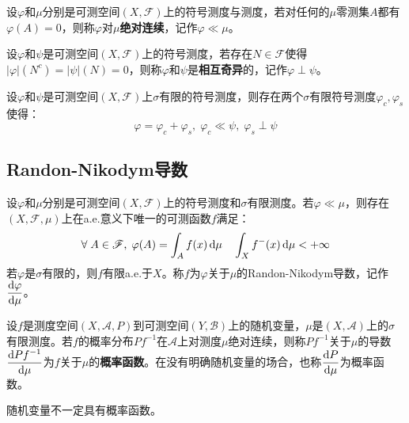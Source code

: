 \begin{definition}
	设$\varphi$和$\mu$分别是可测空间$(X,\mathscr{F})$上的符号测度与测度，若对任何的$\mu$零测集$A$都有$\varphi(A)=0$，则称$\varphi$对$\mu$\textbf{绝对连续}，记作$\varphi\ll\mu$。
\end{definition}
\begin{definition}
	设$\varphi$和$\psi$是可测空间$(X,\mathscr{F})$上的符号测度，若存在$N\in\mathscr{F}$使得$|\varphi|(N^c)=|\psi|(N)=0$，则称$\varphi$和$\psi$是\textbf{相互奇异}的，记作$\varphi\perp\psi$。
\end{definition}
\begin{theorem}
	设$\varphi$和$\psi$是可测空间$(X,\mathscr{F})$上$\sigma$有限的符号测度，则存在两个$\sigma$有限符号测度$\varphi_c,\varphi_s$使得：
	\begin{equation*}
		\varphi=\varphi_c+\varphi_s,\;\varphi_c\ll\psi,\;\varphi_s\perp\psi
	\end{equation*}
\end{theorem}

\subsection{Randon-Nikodym导数}
\begin{theorem}\label{theo:RandomNikodym}
	设$\varphi$和$\mu$分别是可测空间$(X,\mathscr{F})$上的符号测度和$\sigma$有限测度。若$\varphi\ll\mu$，则存在$(X,\mathscr{F},\mu)$上在a.e.意义下唯一的可测函数$f$满足：
	\begin{equation*}
		\forall\;A\in\mathscr{F},\;\varphi(A)=\int_{A}f(x)\mathop{}\!\mathrm{d}\mu\quad\int_{X}f^-(x)\mathop{}\!\mathrm{d}\mu<+\infty
	\end{equation*}
	若$\varphi$是$\sigma$有限的，则$f$有限a.e.于$X$。称$f$为$\varphi$关于$\mu$的Randon-Nikodym导数，记作$\dfrac{\mathop{}\!\mathrm{d}\varphi}{\mathop{}\!\mathrm{d}\mu}$。
\end{theorem}
\begin{definition}
	设$f$是测度空间$(X,\mathscr{A},P)$到可测空间$(Y,\mathscr{B})$上的随机变量，$\mu$是$(X,\mathscr{A})$上的$\sigma$有限测度。若$f$的概率分布$Pf^{-1}$在$\mathscr{A}$上对测度$\mu$绝对连续，则称$Pf^{-1}$关于$\mu$的导数$\dfrac{\mathop{}\!\mathrm{d} Pf^{-1}}{\mathop{}\!\mathrm{d}\mu}$为$f$关于$\mu$的\textbf{概率函数}。在没有明确随机变量的场合，也称$\dfrac{\mathop{}\!\mathrm{d} P}{\mathop{}\!\mathrm{d}\mu}$为概率函数。
\end{definition}
\begin{note}
	随机变量不一定具有概率函数。
\end{note}

